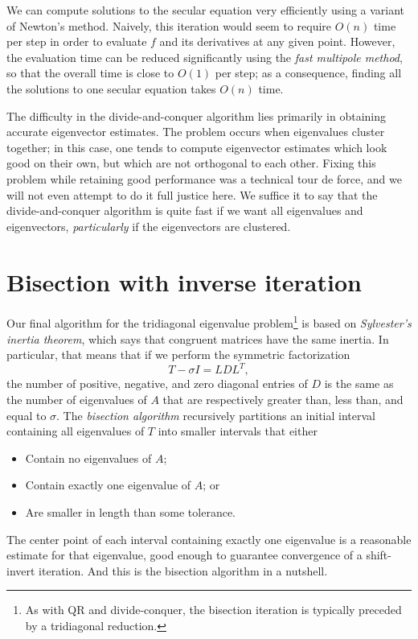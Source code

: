 \documentclass[12pt, leqno]{article} %
\begin{document}
We can compute solutions to the secular equation very efficiently using
a variant of Newton's method.  Naively, this iteration would seem to
require $O(n)$ time per step in order to evaluate $f$ and its derivatives
at any given point.  However, the evaluation time can be reduced
significantly using the {\em fast multipole method}, so that the overall
time is close to $O(1)$ per step; as a consequence, finding all the
solutions to one secular equation takes $O(n)$ time.

The difficulty in the divide-and-conquer algorithm lies primarily in
obtaining accurate eigenvector estimates.  The problem occurs when
eigenvalues cluster together; in this case, one tends to compute
eigenvector estimates which look good on their own, but which are not
orthogonal to each other.  Fixing this problem while retaining good
performance was a technical tour de force, and we will not even attempt
to do it full justice here.  We suffice it to say that the divide-and-conquer
algorithm is quite fast if we want all eigenvalues and eigenvectors,
{\em particularly} if the eigenvectors are clustered.

\section{Bisection with inverse iteration}

Our final algorithm for the tridiagonal eigenvalue problem\footnote{%
As with QR and divide-conquer, the bisection iteration is typically
preceded by a tridiagonal reduction.
} is based on {\em Sylvester's inertia theorem},
which says that congruent matrices have the same inertia.
In particular, that means that if we perform the symmetric
factorization
\[
  T - \sigma I = L D L^T,
\]
the number of positive, negative, and zero diagonal entries of $D$
is the same as the number of eigenvalues of $A$ that are respectively
greater than, less than, and equal to $\sigma$.  The {\em bisection
algorithm} recursively partitions an initial interval containing all
eigenvalues of $T$ into smaller intervals that either
\begin{itemize}
\item Contain no eigenvalues of $A$;
\item Contain exactly one eigenvalue of $A$; or
\item Are smaller in length than some tolerance.
\end{itemize}
The center point of each interval containing exactly one eigenvalue is
a reasonable estimate for that eigenvalue, good enough to guarantee
convergence of a shift-invert iteration.  And this is the bisection
algorithm in a nutshell.
\end{document}
